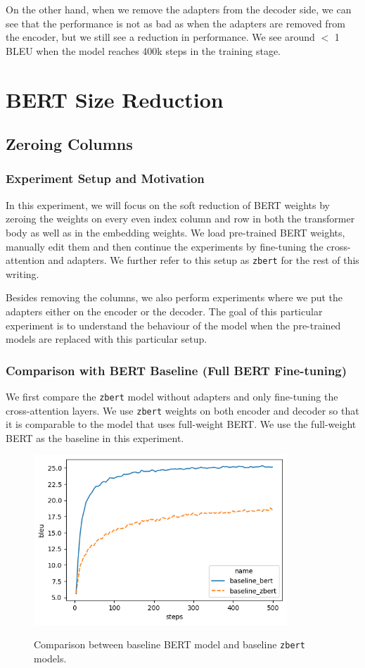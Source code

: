 On the other hand, when we remove the adapters from the decoder side, we can see that the performance is not as bad as when the adapters are removed from the encoder, but we still see a reduction in performance. We see around $<$ 1 BLEU when the model reaches 400k steps in the training stage.

\section{BERT Size Reduction}
\subsection{Zeroing Columns}
\subsubsection{Experiment Setup and Motivation}
In this experiment, we will focus on the soft reduction of BERT weights by zeroing the weights on every even index column and row in both the transformer body as well as in the embedding weights. We load pre-trained BERT weights, manually edit them and then continue the experiments by fine-tuning the cross-attention and adapters. We further refer to this setup as \texttt{zbert} for the rest of this writing.

Besides removing the columns, we also perform experiments where we put the adapters either on the encoder or the decoder. The goal of this particular experiment is to understand the behaviour of the model when the pre-trained models are replaced with this particular setup.

\subsubsection{Comparison with BERT Baseline (Full BERT Fine-tuning)}
We first compare the \texttt{zbert} model without adapters and only fine-tuning the cross-attention layers. We use \texttt{zbert} weights on both encoder and decoder so that it is comparable to the model that uses full-weight BERT. We use the full-weight BERT as the baseline in this experiment.

\begin{figure}[]
    {\includegraphics[width=0.85\textwidth]{img/baseline_zbert.png}}
    \centering
    \caption{Comparison between baseline BERT model and baseline \texttt{zbert} models.}
    \label{img:baseline_zbert}
\end{figure}

